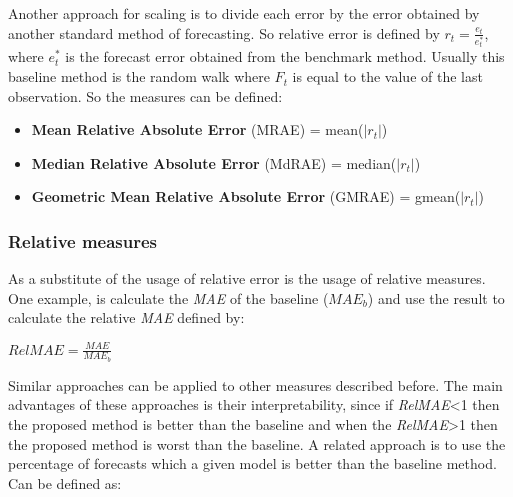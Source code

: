 Another approach for scaling is to divide each error by the error obtained by
another standard method of forecasting. So relative error is defined by
\begin{math} r_t = \frac{e_t}{e_t^*} \end{math}, where \begin{math} e_t^*
\end{math} is the forecast error obtained from the benchmark method. Usually
this baseline method is the random walk where \begin{math}F_t\end{math} is equal
to the value of the last observation.
So the measures can be defined:
\begin{itemize}
  \item \textbf{Mean Relative Absolute Error} (MRAE) =
  mean(\begin{math}\left|r_t\right|\end{math})
  \item \textbf{Median Relative Absolute Error} (MdRAE) =
  median(\begin{math}\left|r_t\right|\end{math})
  \item \textbf{Geometric Mean Relative Absolute Error} (GMRAE) =
  gmean(\begin{math}\left|r_t\right|\end{math})
\end{itemize}

\subsubsection{Relative measures}

As a substitute of the usage of relative error is the usage of relative
measures. One example, is calculate the \emph{MAE} of the baseline
(\begin{math}MAE_b\end{math}) and use the result to calculate the relative
\emph{MAE} defined by:
\\

\begin{center}
\Large
\begin{math}
  RelMAE = \frac{MAE}{MAE_b}
\end{math}
\normalsize
\end{center}

Similar approaches can be applied to other measures described before.
The main advantages of these approaches is their interpretability, since if
\emph{RelMAE}<1 then the proposed method is better than the baseline and when
the \emph{RelMAE}>1 then the proposed method is worst than the baseline.
A related approach is to use the percentage of forecasts which a given model is better than
the baseline method.\cite{Armstrong199269} Can be defined as:
\\

